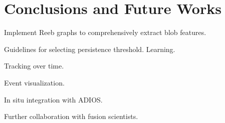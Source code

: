 \section{Conclusions and Future Works}
\label{sec:conclusions}

Implement Reeb graphs to comprehensively extract blob features.  

Guidelines for selecting persistence threshold.  Learning.  

Tracking over time.

Event visualization.  

In situ integration with ADIOS. 

Further collaboration with fusion scientists.  

